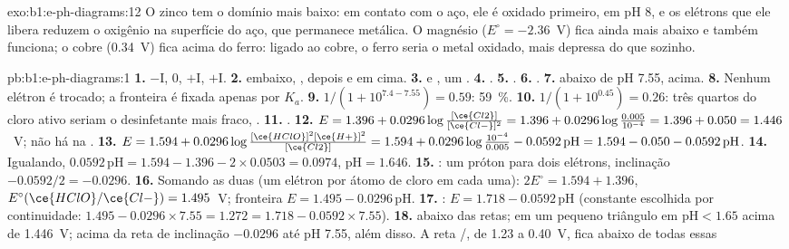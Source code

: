 \begin{solution}{exo:b1:e-ph-diagrams:12}
O zinco tem o domínio mais baixo: em contato com o aço, ele é oxidado
primeiro,  em pH 8, e os elétrons que
ele libera reduzem o oxigênio na superfície do aço, que permanece
metálica. O magnésio ($E^\circ = -2.36$~V) fica ainda mais abaixo e
também funciona; o cobre (0.34~V) fica acima do ferro: ligado ao cobre,
o ferro seria o metal oxidado, mais depressa do que sozinho.
\end{solution}

\begin{solution}{pb:b1:e-ph-diagrams:1}
\textbf{1.} $-$I, 0, $+$I, $+$I.
\textbf{2.}  embaixo, , depois  e  em
cima.
\textbf{3.}  e , um .
\textbf{4.} .
\textbf{5.} .
\textbf{6.} .
\textbf{7.}  abaixo de pH 7.55,  acima.
\textbf{8.} Nenhum elétron é trocado; a fronteira é fixada apenas por
$K_a$.
\textbf{9.} $1/(1 + 10^{7.4 - 7.55}) = 0.59$: \qty{59}{\percent}.
\textbf{10.} $1/(1 + 10^{0.45}) = 0.26$: três quartos do cloro ativo
seriam o desinfetante mais fraco, .
\textbf{11.} .
\textbf{12.} $E = 1.396 + 0.0296\log\frac{[\ce{Cl2}]}{[\ce{Cl-}]^2} = 1.396
+ 0.0296\log\frac{0.005}{10^{-4}} = 1.396 + 0.050 = 1.446$~V; não há 
na .
\textbf{13.} $E = 1.594 + 0.0296\log\frac{[\ce{HClO}]^2[\ce{H+}]^2}{[\ce{Cl2}]}
= 1.594 + 0.0296\log\frac{10^{-4}}{0.005} - 0.0592\,\mathrm{pH} = 1.594 -
0.050 - 0.0592\,\mathrm{pH}$.
\textbf{14.} Igualando, $0.0592\,\mathrm{pH} = 1.594 - 1.396 - 2 \times 0.0503
= 0.0974$, $\mathrm{pH} = 1.646$.
\textbf{15.} : um próton para dois
elétrons, inclinação $-0.0592/2 = -0.0296$.
\textbf{16.} Somando as duas  (um elétron por átomo de cloro
em cada uma): $2E^\circ = 1.594 + 1.396$, $E^\circ(\ce{HClO}/\ce{Cl-}) =
1.495$~V; fronteira $E = 1.495 - 0.0296\,\mathrm{pH}$.
\textbf{17.} : $E = 1.718 - 0.0592\,\mathrm{pH}$
(constante escolhida por continuidade: $1.495 - 0.0296 \times 7.55 = 1.272 = 1.718
- 0.0592 \times 7.55$).
\textbf{18.}  abaixo das retas;  em um pequeno triângulo
em $\mathrm{pH} < 1.65$ acima de 1.446~V;  acima da reta de
inclinação $-0.0296$ até pH 7.55,  além disso. A reta
/, de 1.23 a 0.40~V, fica abaixo de todas essas

\end{solution}

